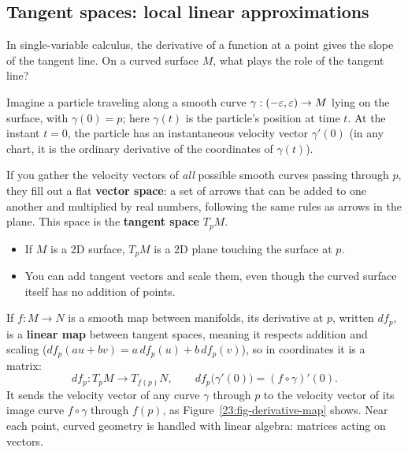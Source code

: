 \subsection{Tangent spaces: local linear approximations}

In single-variable calculus, the derivative of a function at a point gives the slope of the tangent line. On a curved surface $M$, what plays the role of the tangent line?

Imagine a particle traveling along a smooth curve $\gamma: (-\varepsilon, \varepsilon) \to M$ lying on the surface, with $\gamma(0) = p$; here $\gamma(t)$ is the particle's position at time $t$. At the instant $t = 0$, the particle has an instantaneous velocity vector $\gamma'(0)$ (in any chart, it is the ordinary derivative of the coordinates of $\gamma(t)$).

If you gather the velocity vectors of \emph{all} possible smooth curves passing through $p$, they fill out a flat \textbf{vector space}: a set of arrows that can be added to one another and multiplied by real numbers, following the same rules as arrows in the plane. This space is the \textbf{tangent space} $T_p M$.
\begin{itemize}
\item If $M$ is a 2D surface, $T_p M$ is a 2D plane touching the surface at $p$.
\item You can add tangent vectors and scale them, even though the curved surface itself has no addition of points.
\end{itemize}

If $f: M \to N$ is a smooth map between manifolds, its derivative at $p$, written $df_p$, is a \textbf{linear map} between tangent spaces, meaning it respects addition and scaling ($df_p(au + bv) = a\, df_p(u) + b\, df_p(v)$), so in coordinates it is a matrix:
\[
df_p : T_p M \to T_{f(p)} N, \qquad df_p\bigl(\gamma'(0)\bigr) = (f \circ \gamma)'(0).
\]
It sends the velocity vector of any curve $\gamma$ through $p$ to the velocity vector of its image curve $f \circ \gamma$ through $f(p)$, as Figure~\ref{23:fig-derivative-map} shows. Near each point, curved geometry is handled with linear algebra: matrices acting on vectors.

